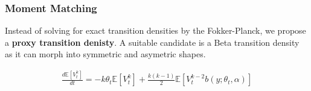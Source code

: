 \documentclass[aspectratio=169]{beamer}\usepackage[utf8]{inputenc}
\newcommand{\E}{\mathbb{E}}
\begin{document}
\begin{frame}\frametitle{Moment Matching}
Instead of solving for exact transition densities by the Fokker-Planck, we propose a \textbf{proxy transition denisty}. A suitable candidate is a Beta transition density as it can morph into symmetric and asymetric shapes.


\begin{equation}
\begin{split}
\frac{d \E[ V^k_t]}{dt} = - k \theta_t \E [ V^k_t] + \frac{k(k-1)}{2} \E [ V^{k-2}_t  b(y;\theta_t, \alpha)]
\end{split}
\end{equation}

\end{frame}
\end{document}
